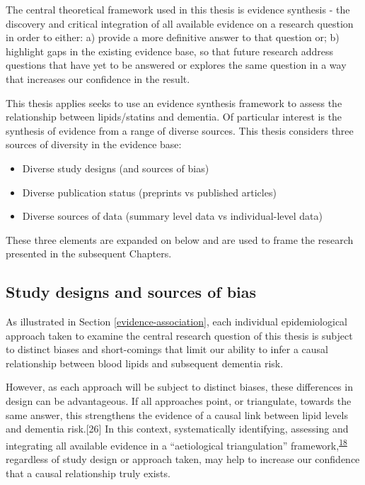 \documentclass[a4paper, twoside]{templates/ociamthesis}
\providecommand{\tightlist}{%
  \setlength{\itemsep}{0pt}\setlength{\parskip}{0pt}}
\begin{document}
The central theoretical framework used in this thesis is evidence synthesis - the discovery and critical integration of all available evidence on a research question in order to either: a) provide a more definitive answer to that question or; b) highlight gaps in the existing evidence base, so that future research address questions that have yet to be answered or explores the same question in a way that increases our confidence in the result.

This thesis applies seeks to use an evidence synthesis framework to assess the relationship between lipids/statins and dementia. Of particular interest is the synthesis of evidence from a range of diverse sources. This thesis considers three sources of diversity in the evidence base:

\begin{itemize}
\tightlist
\item
  Diverse study designs (and sources of bias)
\item
  Diverse publication status (preprints vs published articles)
\item
  Diverse sources of data (summary level data vs individual-level data)
\end{itemize}

These three elements are expanded on below and are used to frame the research presented in the subsequent Chapters.

\hypertarget{study-designs-and-sources-of-bias}{%
\subsection{Study designs and sources of bias}\label{study-designs-and-sources-of-bias}}

As illustrated in Section \ref{evidence-association}, each individual epidemiological approach taken to examine the central research question of this thesis is subject to distinct biases and short-comings that limit our ability to infer a causal relationship between blood lipids and subsequent dementia risk.

However, as each approach will be subject to distinct biases, these differences in design can be advantageous. If all approaches point, or triangulate, towards the same answer, this strengthens the evidence of a causal link between lipid levels and dementia risk.{[}26{]} In this context, systematically identifying, assessing and integrating all available evidence in a ``aetiological triangulation'' framework,\textsuperscript{\protect\hyperlink{ref-lawlor2016a}{18}} regardless of study design or approach taken, may help to increase our confidence that a causal relationship truly exists.
\end{document}
